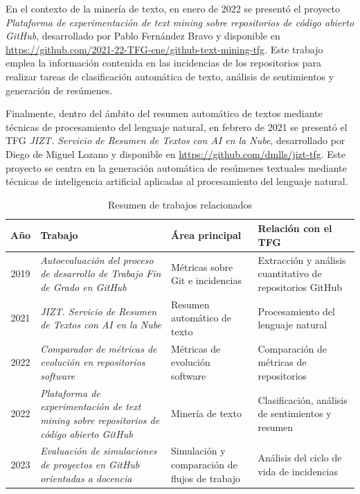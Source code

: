 En el contexto de la minería de texto, en enero de 2022 se presentó el proyecto
\textit{Plataforma de experimentación de text mining sobre repositorios de
      código abierto GitHub}, desarrollado por Pablo Fernández Bravo y disponible en
\url{https://github.com/2021-22-TFG-ene/github-text-mining-tfg}. Este trabajo
emplea la información contenida en las incidencias de los repositorios para
realizar tareas de clasificación automática de texto, análisis de sentimientos
y generación de resúmenes.

Finalmente, dentro del ámbito del resumen automático de textos mediante
técnicas de procesamiento del lenguaje natural, en febrero de 2021 se presentó
el TFG \textit{JIZT. Servicio de Resumen de Textos con AI en la Nube},
desarrollado por Diego de Miguel Lozano y disponible en
\url{https://github.com/dmlls/jizt-tfg}. Este proyecto se centra en la
generación automática de resúmenes textuales mediante técnicas de inteligencia
artificial aplicadas al procesamiento del lenguaje natural.

\begin{table}[H]
      \centering
      \caption{Resumen de trabajos relacionados}
      \label{tab:trabajos_relacionados}
      \begin{tabular}{|c|p{4.5cm}|p{3cm}|p{3cm}|}
            \hline
            \textbf{Año} & \textbf{Trabajo}                                                                                  & \textbf{Área principal}                       & \textbf{Relación con el TFG}                              \\
            \hline 2019  & \textit{Autoevaluación del proceso de desarrollo de Trabajo Fin de Grado en GitHub}               & Métricas sobre Git e incidencias              & Extracción y análisis cuantitativo de repositorios GitHub \\
            \hline 2021  & \textit{JIZT. Servicio de Resumen de Textos con AI en la Nube}                                    & Resumen automático de texto                   & Procesamiento del lenguaje natural                        \\
            \hline 2022  & \textit{Comparador de métricas de evolución en repositorios software}                             & Métricas de evolución software                & Comparación de métricas de repositorios                   \\
            \hline 2022  & \textit{Plataforma de experimentación de text mining sobre repositorios de código abierto GitHub} & Minería de texto                              & Clasificación, análisis de sentimientos y resumen         \\
            \hline 2023  & \textit{Evaluación de simulaciones de proyectos en GitHub orientadas a docencia}                  & Simulación y comparación de flujos de trabajo & Análisis del ciclo de vida de incidencias                 \\
            \hline
      \end{tabular}
\end{table}
